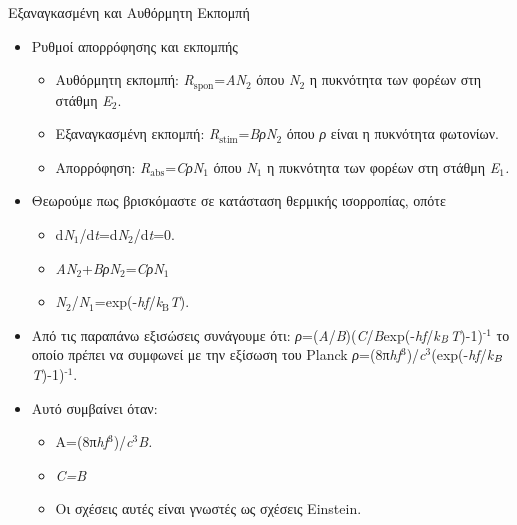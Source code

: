 \documentclass[11pt,aspectratio=169]{beamer}
\begin{document}
\begin{frame}[shrink=20,t]{Eξαναγκασμένη και Αυθόρμητη Εκπομπή}
\begin{itemize}
\item Ρυθμοί απορρόφησης και εκπομπής
\begin{itemize}
\item Αυθόρμητη εκπομπή: \textit{R}$_{\text{spon}}$=\textit{AN}$_{\text{2}}$ όπου \textit{Ν}$_{\text{2}}$ η πυκνότητα των φορέων στη στάθμη \textit{Ε}$_{\text{2}}$.
\item Εξαναγκασμένη εκπομπή: \textit{R}$_{\text{stim}}$=\textit{B}\textit{ρ}\textit{N}$_{\text{2}}$ όπου \textit{ρ} είναι η πυκνότητα φωτονίων.
\item Απορρόφηση: \textit{R}$_{\text{abs}}$=\textit{C}\textit{ρ}\textit{N}$_{\text{1}}$ όπου \textit{Ν}$_{\text{1}}$ η πυκνότητα των φορέων στη στάθμη \textit{Ε}$_{\text{1}}$\textit{.}
\end{itemize}
\item Θεωρούμε πως βρισκόμαστε σε κατάσταση θερμικής ισορροπίας, οπότε
\begin{itemize}
\item d\textit{N}$_{\text{1}}$/d\textit{t}=d\textit{N}$_{\text{2}}$/d\textit{t}=0.
\item \textit{AN}$_{\text{2}}$+\textit{B}\textit{ρΝ}$_{\text{2}}$=\textit{C}\textit{ρΝ}$_{\text{1}}$
\item \textit{Ν}$_{\text{2}}$/\textit{Ν}$_{\text{1}}$=exp(-\textit{hf}/\textit{k}$_{\text{B}}$\textit{T}).
\end{itemize}
\item Από τις παραπάνω εξισώσεις συνάγουμε ότι: \textit{ρ}=(\textit{Α}/\textit{Β})(\textit{C}/\textit{B}exp(-\textit{hf}/\textit{k}$_{\text{\textit{B}}}$\textit{T})-1)$^{\text{-1}}$ το οποίο πρέπει να συμφωνεί με την εξίσωση του Planck \textit{ρ}=(8π\textit{hf}$^{\text{3}}$)/\textit{c}$^{\text{3}}$(exp(-\textit{hf}/\textit{k}$_{\text{\textit{B}}}$\textit{T})-1)$^{\text{-1}}$.
\item Αυτό συμβαίνει όταν:
\begin{itemize}
\item Α=(8π\textit{hf}$^{\text{3}}$)/\textit{c}$^{\text{3}}$\textit{B.}
\item \textit{C=B}
\item Οι σχέσεις αυτές είναι γνωστές ως σχέσεις Einstein.
\end{itemize}
\end{itemize}
\end{frame}
\end{document}
